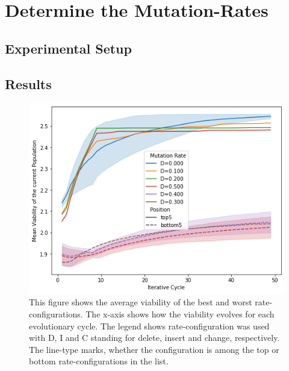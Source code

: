 \documentclass[./../../paper.tex]{subfiles}
\begin{document}
\section{Determine the Mutation-Rates}

\subsection{Experimental Setup}
\label{sec:exp2}


\subsection{Results}

\begin{figure}[htbp]
    \centering
    \includegraphics[width=\textwidth]{figures/generated/exp2_effect_on_viability_top10_last10.png}
    \caption{This figure shows the average viability of the  best and worst rate-configurations. The x-axis shows how the viability evolves for each evolutionary cycle. The legend shows rate-configuration was used with D, I and C standing for delete, insert and change, respectively. The line-type marks, whether the configuration is among the top or bottom rate-configurations in the list.}
    \label{fig:average-mutation-rates}
\end{figure}
\end{document}
